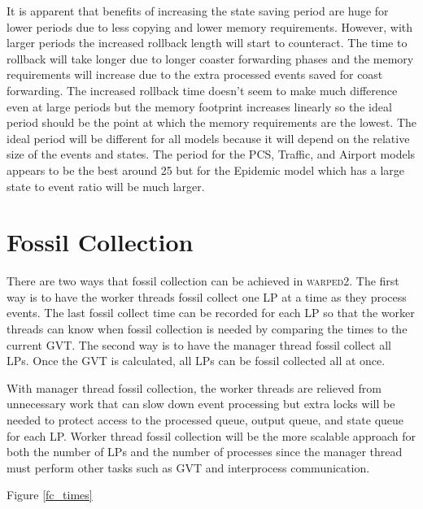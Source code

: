 \documentclass[11pt]{book}
\begin{document}
It is apparent that benefits of increasing the state saving period are huge for lower periods
due to less copying and lower memory requirements. However, with larger periods the increased
rollback length will start to counteract. The time to rollback will take longer due to longer
coaster forwarding phases and the memory requirements will increase due to the extra processed
events saved for coast forwarding. The increased rollback time doesn't seem to make much difference
even at large periods but the memory footprint increases linearly so the ideal period should be
the point at which the memory requirements are the lowest. The ideal period will be different
for all models because it will depend on the relative size of the events and states. The period
for the PCS, Traffic, and Airport models appears to be the best around 25 but for the Epidemic
model which has a large state to event ratio will be much larger.

\section{Fossil Collection}

There are two ways that fossil collection can be achieved in \textsc{warped2}. The first way
is to have the worker threads fossil collect one LP at a time as they process events. The last
fossil collect time can be recorded for each LP so that the worker threads can know when fossil
collection is needed by comparing the times to the current GVT. The second way is to have the
manager thread fossil collect all LPs. Once the GVT is calculated, all LPs can be fossil collected
all at once.

With manager thread fossil collection, the worker threads are relieved from unnecessary work
that can slow down event processing but extra locks will be needed to protect access to the
processed queue, output queue, and state queue for each LP. Worker thread fossil collection
will be the more scalable approach for both the number of LPs and the number of processes since
the manager thread must perform other tasks such as GVT and interprocess communication.

Figure \ref{fc_times} 
\end{document}
